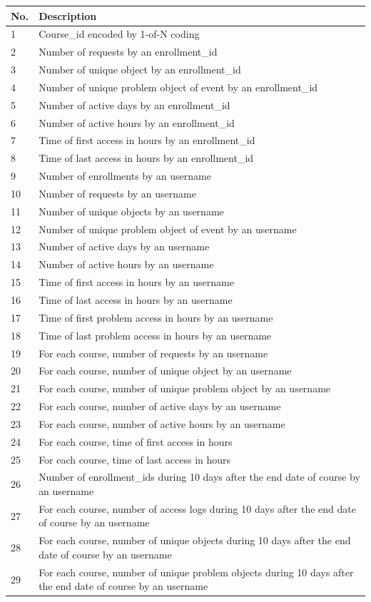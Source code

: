 \begin{center}
  \begin{table}[ht]
    \begin{minipage}{\textwidth}
    {
      \small
      \hfill{}
      \begin{tabular}{|l|l|}
      \hline
      \textbf{No.}&\textbf{Description}\tabularnewline \hline
      1 & Course\_id encoded by 1-of-N coding \tabularnewline
      2 & Number of requests by an enrollment\_id \tabularnewline
      3 & Number of unique object by an enrollment\_id \tabularnewline
      4 & Number of unique problem object of event by an enrollment\_id \tabularnewline
      5 & Number of active days by an enrollment\_id \tabularnewline
      6 & Number of active hours by an enrollment\_id \tabularnewline
      7 & Time of first access in hours by an enrollment\_id \tabularnewline
      8 & Time of last access in hours by an enrollment\_id \tabularnewline
      9 & Number of enrollments by an username \tabularnewline
      10 & Number of requests by an username \tabularnewline
      11 & Number of unique objects by an username \tabularnewline
      12 & Number of unique problem object of event by an username \tabularnewline
      13 & Number of active days by an username \tabularnewline
      14 & Number of active hours by an username \tabularnewline
      15 & Time of first access in hours by an username \tabularnewline
      16 & Time of last access in hours by an username \tabularnewline
      17 & Time of first problem access in hours by an username \tabularnewline
      18 & Time of last problem access in hours by an username \tabularnewline
      19 & For each course, number of requests by an username \tabularnewline
      20 & For each course, number of unique object by an username \tabularnewline
      21 & For each course, number of unique problem object by an username \tabularnewline
      22 & For each course, number of active days by an username \tabularnewline
      23 & For each course, number of active hours by an username \tabularnewline
      24 & For each course, time of first access in hours \tabularnewline
      25 & For each course, time of last access in hours \tabularnewline
      26 & Number of enrollment\_ids during 10 days after the end date of course by an username \tabularnewline
      27 & For each course, number of access logs during 10 days after the end date of course by an username \tabularnewline
      28 & For each course, number of unique objects during 10 days after the end date of course by an username \tabularnewline
      29 & For each course, number of unique problem objects during 10 days after the end date of course by an username \tabularnewline

\end{tabular}}
\end{minipage}
\end{table}
\end{center}
